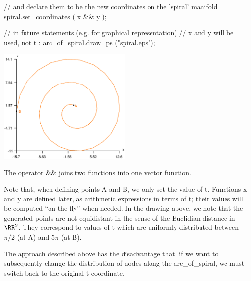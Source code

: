    // and declare them to be the new coordinates on the 'spiral' manifold
   spiral.set_coordinates ( x && y );

   // in future statements (e.g. for graphical representation)
   // x and y will be used, not t :
   arc_of_spiral.draw_ps ("spiral.eps");
\endverbatim

{ 
\centerline{\includegraphics[width=65mm]{spiral.eps}} }

The operator {\codett \&\&} joins two functions into one vector function.

Note that, when defining points {\codett A} and {\codett B}, we only set the value of {\codett t}.
Functions {\codett x} and {\codett y} are defined later, as arithmetic expressions in terms of
{\codett t}; their values will be computed ``on-the-fly'' when needed.
In the drawing above, we note that the generated points are not equidistant in the sense of the
Euclidian distance in $ \RR^2 $.
They correspond to values of {\codett t} which are uniformly distributed between
$ \pi/2 $ (at {\codett A}) and $ 5\pi $ (at {\codett B}).

The approach described above has the disadvantage that, if we want to subsequently change the
distribution of nodes along the {\codett arc\_of\_spiral}, we must switch back to the original
{\codett t} coordinate.

